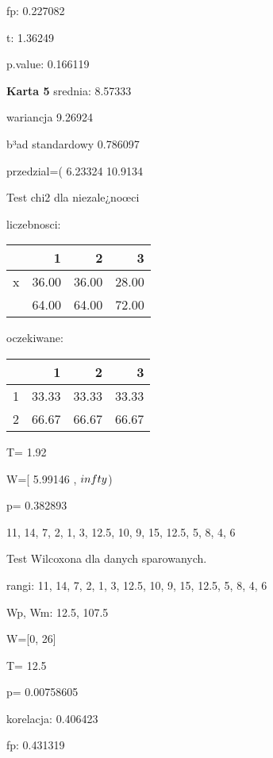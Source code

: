 \documentclass[a4paper,12pt]{article}
\begin{document}
\begin{multicols}{3}
     fp: 0.227082
     
     t: 1.36249
     
     p.value: 0.166119 \vspace{1cm} 

  \textbf{Karta  5 } 
 srednia: 8.57333 
     
     wariancja 9.26924  
     
     b³ad standardowy 0.786097 
     
     przedzial=( 6.23324 10.9134 \vspace{1cm} 

  Test chi2 dla niezale¿noœci 
   
   liczebnosci: %
\begin{tabular}{rrrr}
  \hline
 & 1 & 2 & 3 \\
  \hline
x & 36.00 & 36.00 & 28.00 \\
   & 64.00 & 64.00 & 72.00 \\
   \hline
\end{tabular}
 
   
   oczekiwane: %
\begin{tabular}{rrrr}
  \hline
 & 1 & 2 & 3 \\
  \hline
1 & 33.33 & 33.33 & 33.33 \\
  2 & 66.67 & 66.67 & 66.67 \\
   \hline
\end{tabular}
 
   
   T= 1.92 
   
   W=[ 5.99146 , $\\infty$) 
   
   p= 0.382893 \vspace{1cm} 

  11, 14, 7, 2, 1, 3, 12.5, 10, 9, 15, 12.5, 5, 8, 4, 6 

  Test Wilcoxona dla danych sparowanych. 
  
  rangi: 11, 14, 7, 2, 1, 3, 12.5, 10, 9, 15, 12.5, 5, 8, 4, 6 
  
  Wp, Wm:  12.5,  107.5 
  
  W=[0, 26]  
  
  T=  12.5 
  
  p= 0.00758605 \vspace{1cm} 

  korelacja: 0.406423
     
     fp: 0.431319
     

\end{multicols}
\end{document}
